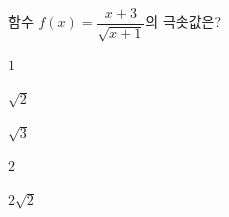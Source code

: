 함수 $f(x)=\dfrac{x+3}{\sqrt{x+1}}$의 극솟값은?
\begin{choices32}{\rule[-3ex]{0pt}{8ex}$1$}{\rule[-3ex]{0pt}{8ex}$\sqrt{2}$}{\rule[-3ex]{0pt}{8ex}$\sqrt{3}$}{\rule[-3ex]{0pt}{8ex}$2$}{\rule[-3ex]{0pt}{8ex}$2\sqrt{2}$}\end{choices32}
